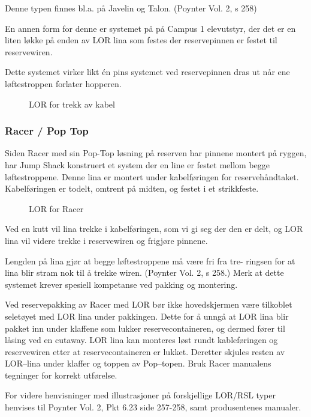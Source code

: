Denne typen finnes bl.a. på Javelin og Talon. (Poynter Vol. 2, s 258)

En annen form for denne er systemet på på Campus 1 elevutstyr, der det er en liten løkke på enden av LOR lina som festes der reservepinnen er festet til reservewiren.

Dette systemet virker likt én pins systemet ved reservepinnen dras ut når ene løftestroppen forlater hopperen.

\begin{figure}
	\caption{LOR for trekk av kabel}
\end{figure}

\subsubsection{Racer / Pop Top}
Siden Racer med sin Pop-Top løsning på reserven har pinnene montert på ryggen, har Jump Shack konstruert et system der en line er festet mellom begge løftestroppene. Denne lina er montert under kabelføringen for reservehåndtaket. Kabelføringen er todelt, omtrent på midten, og festet i et strikkfeste.

\begin{figure}
	\caption{LOR for Racer}
\end{figure}

Ved en kutt vil lina trekke i kabelføringen, som vi gi seg der den er delt, og LOR lina vil videre trekke i reservewiren og frigjøre pinnene.

Lengden på lina gjør at begge løftestroppene må være fri fra tre- ringsen for at lina blir stram nok til å trekke wiren. (Poynter Vol. 2, s 258.) Merk at dette systemet krever spesiell kompetanse ved pakking og montering.

Ved reservepakking av Racer med LOR bør ikke hovedskjermen være tilkoblet seletøyet med LOR lina under pakkingen. Dette for å unngå at LOR lina blir pakket inn under klaffene som lukker reservecontaineren, og dermed fører til låsing ved en cutaway. LOR lina kan monteres løst rundt kableføringen og reservewiren etter at reservecontaineren er lukket. Deretter skjules resten av LOR–lina under klaffer og toppen av Pop–topen. Bruk Racer manualens tegninger for korrekt utførelse.

For videre henvisninger med illustrasjoner på forskjellige LOR/RSL typer henvises til Poynter Vol. 2, Pkt 6.23 side 257-258, samt produsentenes manualer.

